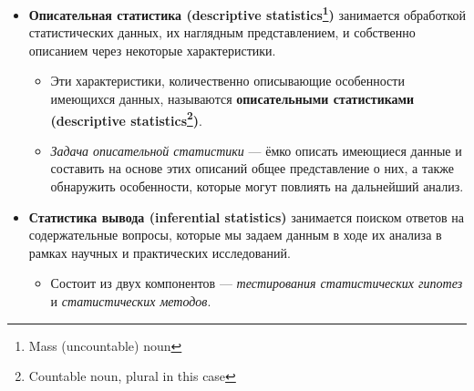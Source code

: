 \documentclass[
  letterpaper,
]{scrbook}
\providecommand{\tightlist}{%
  \setlength{\itemsep}{0pt}\setlength{\parskip}{0pt}}\usepackage{longtable,booktabs,array}
\theoremstyle{definition}
\theoremstyle{remark}
\begin{document}
\begin{itemize}
\tightlist
\item
  \textbf{Описательная статистика (descriptive statistics\footnote{Mass
    (uncountable) noun})} занимается обработкой статистических данных,
  их наглядным представлением, и собственно описанием через некоторые
  характеристики.

  \begin{itemize}
  \tightlist
  \item
    Эти характеристики, количественно описывающие особенности имеющихся
    данных, называются \textbf{описательными статистиками (descriptive
    statistics\footnote{Countable noun, plural in this case})}.
  \item
    \emph{Задача описательной статистики} --- ёмко описать имеющиеся
    данные и составить на основе этих описаний общее представление о
    них, а также обнаружить особенности, которые могут повлиять на
    дальнейший анализ.
  \end{itemize}
\item
  \textbf{Статистика вывода (inferential statistics)} занимается поиском
  ответов на содержательные вопросы, которые мы задаем данным в ходе их
  анализа в рамках научных и практических исследований.

  \begin{itemize}
  \tightlist
  \item
    Состоит из двух компонентов --- \emph{тестирования статистических
    гипотез} и \emph{статистических методов}.
  \end{itemize}
\end{itemize}
\end{document}
